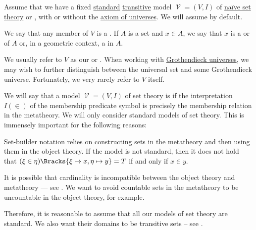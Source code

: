 \begin{definition}\label{def:set}
  Assume that we have a fixed \hyperref[rem:standard_model_of_set_theory]{standard} \hyperref[rem:transitive_model_of_set_theory]{transitive} model \( \mscrV = (V, I) \) of \hyperref[def:naive_set_theory]{na\"ive set theory} or \hyperref[def:zfc]{}, with or without the \hyperref[def:axiom_of_universes]{axiom of universes}. We will assume  by default.

  We say that any member of \( V \) is a . If \( A \) is a set and \( x \in A \), we say that \( x \) is a  or  of \( A \) or, in a geometric context, a  in \( A \).

  We usually refer to \( V \) as our  or . When working with \hyperref[def:grothendieck_universe]{Grothendieck universes}, we may wish to further distinguish between the universal set and some Grothendieck universe. Fortunately, we very rarely refer to \( V \) itself.
\end{definition}

\begin{remark}\label{rem:standard_model_of_set_theory}
  We will say that a model \( \mscrV = (V, I) \) of set theory is  if the interpretation \( I(\in) \) of the membership predicate symbol is precisely the membership relation in the metatheory. We will only consider standard models of set theory. This is immensely important for the following reasons:

  \begin{itemize}
     Set-builder notation relies on constructing sets in the metatheory and then using them in the object theory. If the model is not standard, then it does not hold that \( (\xi \in \eta)\Bracks{\xi \mapsto x, \eta \mapsto y} = T \) if and only if \( x \in y \).

     It is possible that cardinality is incompatible between the object theory and metatheory --- see . We want to avoid countable sets in the metatheory to be uncountable in the object theory, for example.
  \end{itemize}

  Therefore, it is reasonable to assume that all our models of set theory are standard. We also want their domains to be transitive sets -- see .
\end{remark}


